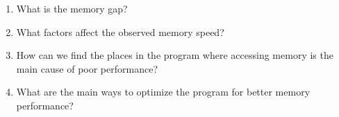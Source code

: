\begin{enumerate}
\item What is the memory gap?
\item What factors affect the observed memory speed?
\item How can we find the places in the program where accessing memory is the main cause of poor performance?
\item What are the main ways to optimize the program for better memory performance?
\end{enumerate}